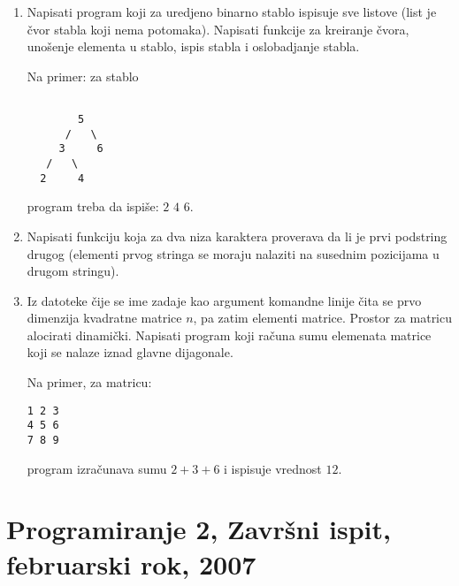\begin{enumerate}
\item Napisati program koji za uredjeno binarno stablo
ispisuje sve listove (list je \v cvor stabla koji nema potomaka).
Napisati funkcije za kreiranje \v cvora,
uno\v senje elementa u stablo, ispis stabla i oslobadjanje stabla.

Na primer: za stablo

\begin{verbatim}

        5
      /   \
     3     6
   /   \
  2     4

\end{verbatim}

program treba da ispi\v se: $2$ $4$ $6$.

\item
Napisati funkciju koja za dva niza karaktera proverava da li je
prvi podstring drugog (elementi prvog stringa se moraju nalaziti na susednim
pozicijama u drugom stringu).

\item
Iz datoteke \v cije se ime zadaje kao argument komandne linije
\v cita se prvo dimenzija kvadratne matrice $n$, pa zatim elementi
matrice. Prostor za matricu alocirati dinami\v cki. Napisati program
koji ra\v cuna sumu elemenata matrice koji se nalaze iznad glavne dijagonale.

Na primer, za matricu:
\begin{verbatim}
1 2 3
4 5 6
7 8 9
\end{verbatim}

program izra\v cunava sumu $2+3+6$ i ispisuje vrednost $12$.

\end{enumerate}



\section{Programiranje 2, Zavr\v{s}ni ispit, februarski rok, 2007}


